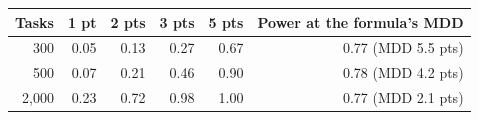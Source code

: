 \begin{tabular}{rrrrrr}
\toprule
Tasks & 1 pt & 2 pts & 3 pts & 5 pts & Power at the formula's MDD \\
\midrule
300 & 0.05 & 0.13 & 0.27 & 0.67 & 0.77 (MDD 5.5 pts) \\
500 & 0.07 & 0.21 & 0.46 & 0.90 & 0.78 (MDD 4.2 pts) \\
2,000 & 0.23 & 0.72 & 0.98 & 1.00 & 0.77 (MDD 2.1 pts) \\
\bottomrule
\end{tabular}
